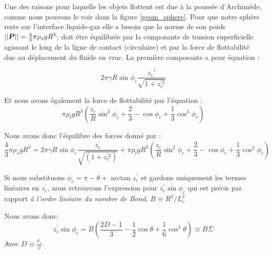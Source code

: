         Une des raisons pour laquelle les objets flottent est due à la poussée d'Archimède, comme nous pouvons le voir dans la figure \ref{geom_sphere}. Pour que notre sphère reste sur l'interface liquide-gaz elle a besoin que la norme de son poids \(||\vb*{P}||=\frac{4}{3}\pi\rho_{s}gR^3\); doit être équilibrée par la composante de tension superficielle agissant le long de la ligne de contact (circulaire) et par la force de flottabilité due au déplacement du fluide en vrac. La première composante a pour équation :

        \begin{equation}
            2\pi\gamma R\sin{\phi_c}\frac{z_c'}{\sqrt{1+z_c^{'2}}}
            \label{eq:tensionSuperficielle}
        \end{equation}

        Et nous avons également la force de flottabilité par l'équation :
        \begin{equation}
            \pi\rho_l g R^3 \left(\frac{z_c}{R}\sin^2{\phi_c} + \frac{2}{3}-\cos{\phi_c}+\frac{1}{3}\cos^3{\phi_c}\right)
            \label{eq:buoyancyForce}
        \end{equation}


        Nous avons donc l'équilibre des forces donné par :
        \begin{equation}
            \frac{4}{3}\pi\rho_{s}gR^3 =2\pi\gamma R \sin\phi_c \frac{z_c^{'}}{\sqrt{(1+z_c^{'2})}} + \pi\rho_l g R^3 \left(\frac{z_c}{R}\sin^2 \phi_c + \frac{2}{3}-\cos\phi_c+\frac{1}{3}\cos^3 \phi_c\right)
            \label{eq:BalanceOfForces}
        \end{equation}


        Si nous substituons \(\phi_c = \pi - \theta + \arctan z_c^{'}\) et gardons uniquement les termes linéaires en \(z_c^{'}\), nous retrouvons l'expression pour \(z_c^{'}\sin \phi_c\) qui est précis par rapport \textit{à l'ordre linéaire du nombre de Bond}, \(B \equiv R^2/L_c^2\) 

        Nous avons donc:
        \begin{equation}
            z_c^{'}\sin \phi_c = B\left(\frac{2D-1}{3}-\frac{1}{2}\cos \theta + \frac{1}{6} \cos^3 \theta\right) \equiv B\Sigma
            \label{eq:bondsigma}
        \end{equation}
        Avec \(D \equiv \frac{\rho_s}{\rho}\).

